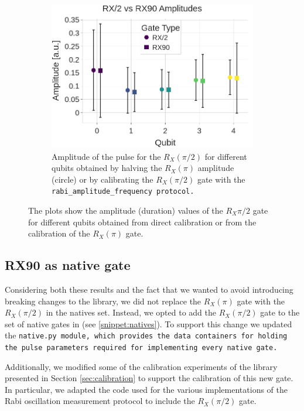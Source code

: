 \begin{figure}[h!]
\begin{subfigure}[t]{0.32\textwidth}
        \label{fig:RX90_duration}
    \end{subfigure}
    \hfill
    \begin{subfigure}[t]{0.32\textwidth}
        \includegraphics[width=\textwidth]{figures/png/RX90/rabi_af.png}
        \caption{Amplitude of the pulse for the $R_X(\pi/2)$ for different qubits obtained by halving the $R_X(\pi)$ amplitude (circle) or by calibrating the $R_X(\pi/2)$ gate with the \tt{rabi\_amplitude\_frequency} protocol.}
        \label{fig:RX90_af}
    \end{subfigure}
    \caption{The plots show the amplitude (duration) values of the $R_X{\pi/2}$ gate for different qubits obtained from direct calibration or from the calibration of the $R_X(\pi)$ gate.} 
    \label{fig:RXvsRX90}
\end{figure}

\subsection{RX90 as native gate}
Considering both these results and the fact that we wanted to avoid introducing breaking changes to the library, we did not replace the $R_X(\pi)$ gate with the $R_X(\pi/2)$ in the natives set. 
Instead, we opted to add the $R_X(\pi/2)$ gate to the set of native gates in \Qibolab (see \ref{snippet:natives}).
To support this change we updated the \tt{native.py} module, which provides the data containers for holding the pulse parameters required for implementing every native gate.

Additionally, we modified some of the calibration experiments of the \Qibocal library presented in Section \ref{sec:calibration} to support the calibration of this new gate.
In particular, we adapted the code used for the various implementations of the Rabi oscillation measurement protocol to include the $R_X(\pi/2)$ gate.

